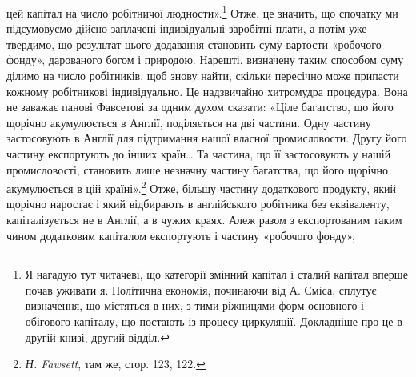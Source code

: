 \parcont{}  %
цей капітал на число робітничої людности».\footnote{
Я нагадую тут читачеві, що категорії змінний капітал і сталий
капітал вперше почав уживати я. Політична економія, починаючи від
А. Сміса, сплутує визначення, що містяться в них, з тими ріжницями
форм основного і обігового капіталу, що постають із процесу циркуляції.
Докладніше про це в другій книзі, другий відділ.
} Отже, це значить,
що спочатку ми підсумовуємо дійсно заплачені індивідуальні
заробітні плати, а потім уже твердимо, що результат цього додавання
становить суму вартости «робочого фонду», дарованого
богом і природою. Нарешті, визначену таким способом суму
ділимо на число робітників, щоб знову найти, скільки пересічно
може припасти кожному робітникові індивідуально. Це надзвичайно
хитромудра процедура. Вона не заважає панові Фавсетові
за одним духом сказати: «Ціле багатство, що його щорічно
акумулюється в Англії, поділяється на дві частини. Одну
частину застосовують в Англії для підтримання нашої власної
промисловости. Другу його частину експортують до інших
країн\dots{} Та частина, що її застосовують у нашій промисловості,
становить лише незначну частину багатства, що його щорічно
акумулюється в цій країні».\footnote{
\emph{Н. Fawsett}, там же, стор. 123, 122.
} Отже, більшу частину додаткового
продукту, який щорічно наростає і який відбирають в англійського
робітника без еквіваленту, капіталізується не в Англії,
а в чужих краях. Алеж разом з експортованим таким чином
додатковим капіталом експортують і частину «робочого фонду»,
